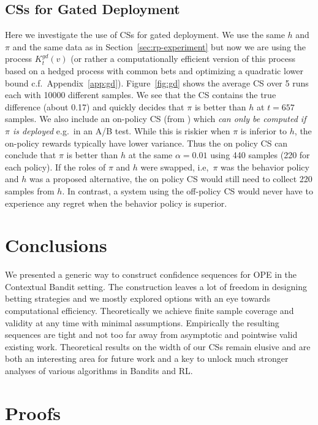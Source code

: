 \subsection{CSs for Gated Deployment}
Here we investigate the use of CSs for gated deployment. 
We use the same $h$ and $\pi$ and the same data as 
in Section~\ref{sec:rp-experiment} but now we are 
using the process $K_t^{gd}(v)$ 
(or rather a computationally efficient version 
of this process based on a hedged process with 
common bets and optimizing a quadratic lower bound
c.f.\ Appendix~\ref{app:gd}).
Figure~\ref{fig:gd} shows the average CS over 5 runs
each with 10000 different samples. We see that the 
CS contains the true difference (about 0.17) and quickly
decides that $\pi$ is better than $h$ at $t=657$ samples.
We also include an on-policy CS (from \cite{waudby-smith_variance-adaptive_2020}) which
\emph{can only be computed if $\pi$ is deployed} 
e.g.\ in an A/B test. While this is riskier 
when $\pi$ is inferior to $h$, the on-policy rewards 
typically have lower variance. Thus the on policy CS can 
conclude that $\pi$ is better than $h$ at the 
same $\alpha=0.01$ using 440 samples 
(220 for each policy). If the roles of 
$\pi$ and $h$ were swapped, i.e,\ $\pi$ was the 
behavior policy and $h$ was a proposed alternative,
the on policy CS would still need to collect 220
samples from $h$. In contrast, a system using the off-policy CS 
would never have to experience any regret when 
the behavior policy is superior.


\section{Conclusions}
We presented a generic way to construct confidence sequences 
for OPE in the Contextual Bandit setting. The construction leaves 
a lot of freedom in designing betting strategies and we mostly 
explored options with an eye towards computational
efficiency. Theoretically we achieve finite sample coverage 
and validity at any time with minimal assumptions. Empirically
the resulting sequences are tight and not too far away from asymptotic 
and pointwise valid existing work. Theoretical results on the 
width of our CSs remain elusive and are both an interesting 
area for future work and a key to unlock much stronger 
analyses of various algorithms in Bandits and RL.

\newpage



\onecolumn
\appendix
\section{Proofs}

